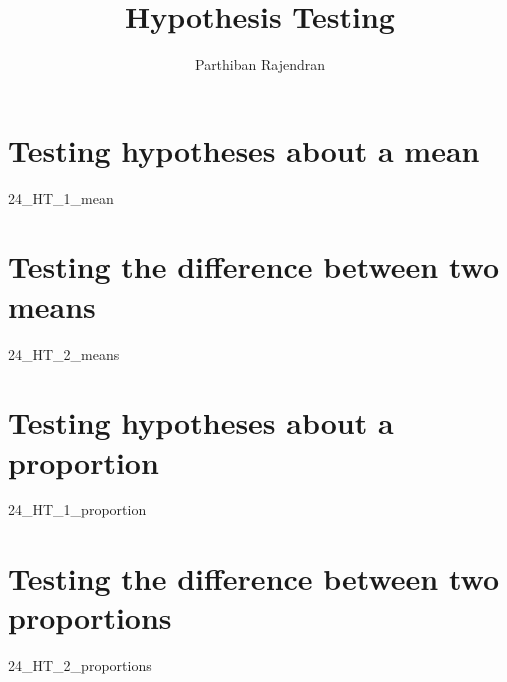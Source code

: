 \documentclass[float=false, crop=false,11pt,oneside]{book}
\title{Hypothesis Testing}
\author{Parthiban Rajendran}
\begin{document}
    
    \maketitle 

    \tableofcontents

   
    \chapter{Testing hypotheses about a mean}
	{24_HT_1_mean}   
	
	\chapter{Testing the difference between two means} 
	{24_HT_2_means}
	
	\chapter{Testing hypotheses about a proportion} 
	{24_HT_1_proportion}

	\chapter{Testing the difference between two proportions} 
	{24_HT_2_proportions}
	
	
	\nocite{*}
	 	
\end{document}
